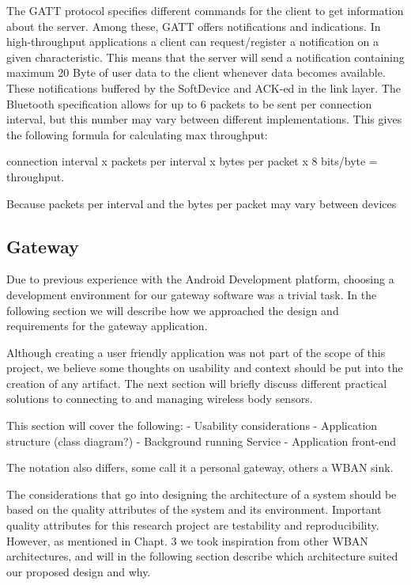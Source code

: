 The GATT protocol specifies different commands for the client to get information about the server. Among these, GATT offers notifications and indications. In high-throughput applications a client can request/register a notification on a given characteristic. This means that the server will send a notification containing maximum 20 Byte of user data to the client whenever data becomes available. These notifications buffered by the SoftDevice and ACK-ed in the link layer. The Bluetooth specification allows for up to 6 packets to be sent per connection interval, but this number may vary between different implementations. This gives the following formula for calculating max throughput:

connection interval x packets per interval x bytes per packet x 8 bits/byte = throughput.

Because packets per interval and the bytes per packet may vary between devices 



\subsection{Gateway} %
\label{sub:gateway}

Due to previous experience with the Android Development platform, choosing a development environment for our gateway software was a trivial task. In the following section we will describe how we approached the design and requirements for the gateway application. 

Although creating a user friendly application was not part of the scope of this project, we believe some thoughts on usability and context should be put into the creation of any artifact. The next section will briefly discuss different practical solutions to connecting to and managing wireless body sensors.

This section will cover the following:
	- Usability considerations
	- Application structure (class diagram?)	
		- Background running Service 
		- Application front-end

The notation also differs, some call it a personal gateway, others a WBAN sink. 

The considerations that go into designing the architecture of a system should be based on the quality attributes of the system and its environment. Important quality attributes for this research project are testability and reproducibility. However, as mentioned in Chapt. 3 we took inspiration from other WBAN architectures, and will in the following section describe which architecture suited our proposed design and why.

